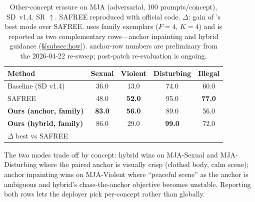 \begin{table}[!tb]
    \centering
    \renewcommand{\arraystretch}{1.15}
    \setlength{\tabcolsep}{0.55em}
    \caption{Other-concept erasure on MJA (adversarial, 100 prompts/concept), SD~v1.4. SR $\uparrow$. SAFREE reproduced with official code. $\Delta$: gain of \ours{}'s best mode over SAFREE. \ours{} uses family exemplars ($F{=}4$, $K{=}4$) and is reported as two complementary rows---anchor inpainting and hybrid guidance (\S\ref{subsec:how}). \ours{} anchor-row numbers are preliminary from the 2026-04-22 re-sweep; post-patch re-evaluation is ongoing.}
    \label{table:multi}
    \vspace{2pt}
    \small
    \begin{tabular}{lcccc}
    \toprule
    \textbf{Method} & \textbf{Sexual} & \textbf{Violent} & \textbf{Disturbing} & \textbf{Illegal} \\
    \midrule
    Baseline (SD v1.4) & 36.0 & 13.0 & 74.0 & 60.0 \\
    SAFREE             & 48.0 & \textbf{52.0} & 95.0 & \textbf{77.0} \\
    \midrule
    \rowcolor{blue!8} \textbf{Ours (anchor, family)} & \textbf{83.0} & \textbf{56.0} & 89.0 & 56.0 \\
    \rowcolor{blue!8} \textbf{Ours (hybrid, family)} & 86.0          & 29.0          & \textbf{99.0} & 72.0 \\
    \midrule
    $\Delta$ best vs SAFREE & \color{green!50!black}{+38.0} & \color{green!50!black}{+4.0} & \color{green!50!black}{+4.0} & \color{red!70!black}{$-$5.0} \\
    \bottomrule
    \end{tabular}

    \vspace{0.4em}
    {\footnotesize The two modes trade off by concept: hybrid wins on MJA-Sexual and MJA-Disturbing where the paired anchor is visually crisp (clothed body, calm scene); anchor inpainting wins on MJA-Violent where ``peaceful scene'' as the anchor is ambiguous and hybrid's chase-the-anchor objective becomes unstable. Reporting both rows lets the deployer pick per-concept rather than globally.}
\end{table}
